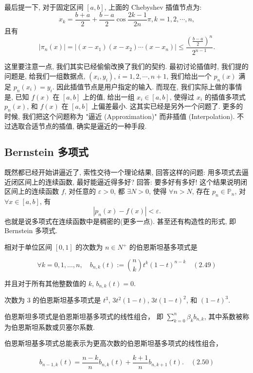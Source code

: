 \documentclass[a4paper]{ctexart}
\begin{document}
{最后提一下, 对于固定区间 $[a, b]$, 上面的 Chebyshev 插值节点为:
$$
x_k = \frac{b + a}{2} + \frac{b - a}{2} \cos\frac{2k - 1}{2n} \pi, k = 1, 2, \cdots, n,
$$
且有
$$
|\pi_{n}(x)| = |(x - x_1) (x - x_2) \cdots (x - x_n)| \leq
\frac{\left(\frac{b - a}{2}\right)^n}{2^{n - 1}}.
$$

这里要注意一点, 我们其实已经偷偷改换了我们的契约. 最初讨论插值时, 
我们提的问题是, 给我们一组数据点, $(x_i, y_i)$, $i = 1, 2, \cdots, n + 1$, 
我们给出一个 $p_n(x)$ 满足 $p_n(x_i) = y_i$. 因此插值节点是用户指定的输入. 
而现在, 我们实际上做的事情是, 已知 $f(x)$ 在 $[a, b]$ 上的值, 
给出一组 $x_i \in [a, b]$, 使得过 $x_i$ 的插值多项式 $p_n(x)$, 
和 $f(x)$ 在 $[a, b]$ 上偏差最小. 这其实已经是另外一个问题了. 
更多的时候, 我们把这个问题称为 "逼近 (Approximation)" 而非插值 (Interpolation).
不过选取合适节点的插值, 确实是逼近的一种手段. 

\subsection{Bernstein 多项式}

既然都已经开始讲逼近了, 索性交待一个理论结果, 回答这样的问题: 
用多项式去逼近闭区间上的连续函数, 最好能逼近得多好? 回答: 要多好有多好! 
这个结果说明闭区间上的连续函数 $f$, 对任意的 $\varepsilon > 0$, 
都 $\exists N > 0$, 使得 $\forall n > N$, 存在 $p_n \in \mathbb{P}_n$, 
对 $\forall x \in [a, b]$, 有
$$
|p_n(x) - f(x)| < \varepsilon.
$$
也就是说多项式在连续函数中是稠密的(更多一点). 甚至还有构造性的形式, 即
Bernstein 多项式. 


 相对于单位区间 \([0,1]\) 的次数为 \(n \in N^{+}\) 的伯恩斯坦基多项式是

\[ \forall k=0,1,\ldots, n,\quad b_{n, k}(t) := \binom{n}{k} t^{k}(1-t)^{n-k} \quad (2.49) \]

并且对于所有其他整数值的 \(k\), \(b_{n, k}(t) = 0\). 

 次数为 $3$ 的伯恩斯坦基多项式是 \(t^3\), \(3t^2(1-t)\), \(3t(1-t)^2\), 和 \((1-t)^3\).

 伯恩斯坦多项式是伯恩斯坦基多项式的线性组合，
即 \(\sum_{k=0}^{n}\beta_{k} b_{n, k}\), 其中系数被称为伯恩斯坦系数或贝塞尔系数.

 伯恩斯坦基多项式总能表示为更高次数的伯恩斯坦基多项式的线性组合，

\[ b_{n-1, k}(t) = \frac{n-k}{n} b_{n, k}(t) + \frac{k+1}{n} b_{n, k+1}(t). \quad (2.50) \]

}
\end{document}
